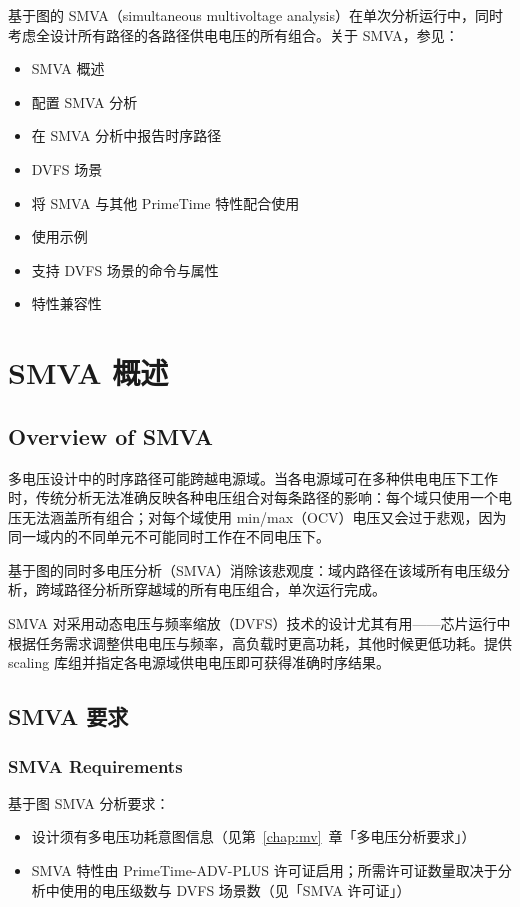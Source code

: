 \label{chap:smva}

基于图的 SMVA（simultaneous multivoltage analysis）在单次分析运行中，同时考虑全设计所有路径的各路径供电电压的所有组合。关于 SMVA，参见：
\begin{itemize}
  \item SMVA 概述
  \item 配置 SMVA 分析
  \item 在 SMVA 分析中报告时序路径
  \item DVFS 场景
  \item 将 SMVA 与其他 PrimeTime 特性配合使用
  \item 使用示例
  \item 支持 DVFS 场景的命令与属性
  \item 特性兼容性
\end{itemize}

\section{SMVA 概述}
\subsection*{Overview of SMVA}

多电压设计中的时序路径可能跨越电源域。当各电源域可在多种供电电压下工作时，传统分析无法准确反映各种电压组合对每条路径的影响：每个域只使用一个电压无法涵盖所有组合；对每个域使用 min/max（OCV）电压又会过于悲观，因为同一域内的不同单元不可能同时工作在不同电压下。

基于图的同时多电压分析（SMVA）消除该悲观度：域内路径在该域所有电压级分析，跨域路径分析所穿越域的所有电压组合，单次运行完成。

SMVA 对采用动态电压与频率缩放（DVFS）技术的设计尤其有用——芯片运行中根据任务需求调整供电电压与频率，高负载时更高功耗，其他时候更低功耗。提供 scaling 库组并指定各电源域供电电压即可获得准确时序结果。

\subsection{SMVA 要求}
\subsubsection*{SMVA Requirements}

基于图 SMVA 分析要求：
\begin{itemize}
  \item 设计须有多电压功耗意图信息（见第~\ref{chap:mv}~章「多电压分析要求」）
  \item SMVA 特性由 PrimeTime-ADV-PLUS 许可证启用；所需许可证数量取决于分析中使用的电压级数与 DVFS 场景数（见「SMVA 许可证」）
\end{itemize}

